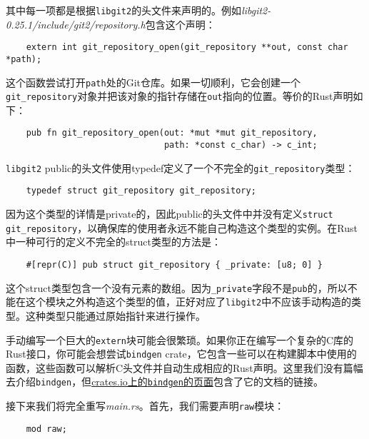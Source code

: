 其中每一项都是根据\texttt{libgit2}的头文件来声明的。例如\emph{libgit2-0.25.1/include/git2/repository.h}包含这个声明：
\begin{verbatim}
    extern int git_repository_open(git_repository **out, const char *path);
\end{verbatim}

这个函数尝试打开\texttt{path}处的Git仓库。如果一切顺利，它会创建一个\texttt{git\_repository}对象并把该对象的指针存储在\texttt{out}指向的位置。等价的Rust声明如下：
\begin{verbatim}
    pub fn git_repository_open(out: *mut *mut git_repository,
                               path: *const c_char) -> c_int;
\end{verbatim}

\texttt{libgit2} public的头文件使用typedef定义了一个不完全的\texttt{git\_repository}类型：
\begin{verbatim}
    typedef struct git_repository git_repository;
\end{verbatim}

因为这个类型的详情是private的，因此public的头文件中并没有定义\texttt{struct git\_repository}，以确保库的使用者永远不能自己构造这个类型的实例。在Rust中一种可行的定义不完全的struct类型的方法是：
\begin{verbatim}
    #[repr(C)] pub struct git_repository { _private: [u8; 0] }
\end{verbatim}

这个struct类型包含一个没有元素的数组。因为\texttt{\_private}字段不是\texttt{pub}的，所以不能在这个模块之外构造这个类型的值，正好对应了\texttt{libgit2}中不应该手动构造的类型。这种类型只能通过原始指针来进行操作。

手动编写一个巨大的\texttt{extern}块可能会很繁琐。如果你正在编写一个复杂的C库的Rust接口，你可能会想尝试\texttt{bindgen} crate，它包含一些可以在构建脚本中使用的函数，这些函数可以解析C头文件并自动生成相应的Rust声明。这里我们没有篇幅去介绍\texttt{bindgen}，但\href{https://crates.io/crates/bindgen}{crates.io上的\texttt{bindgen}的页面}包含了它的文档的链接。

接下来我们将完全重写\emph{main.rs}。首先，我们需要声明\texttt{raw}模块：
\begin{verbatim}
    mod raw;
\end{verbatim}

